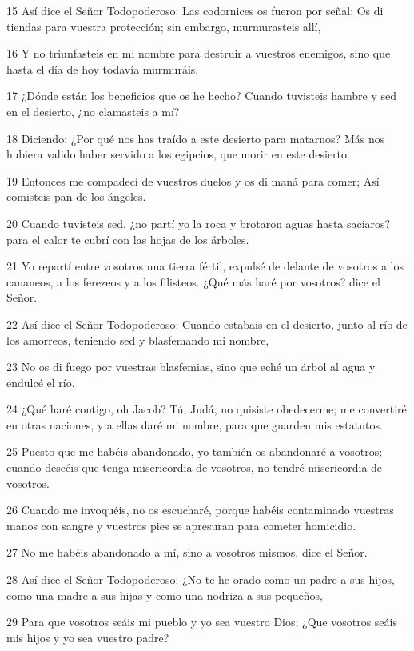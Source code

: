 \par 15 Así dice el Señor Todopoderoso: Las codornices os fueron por señal; Os di tiendas para vuestra protección; sin embargo, murmurasteis allí,
\par 16 Y no triunfasteis en mi nombre para destruir a vuestros enemigos, sino que hasta el día de hoy todavía murmuráis.
\par 17 ¿Dónde están los beneficios que os he hecho? Cuando tuvisteis hambre y sed en el desierto, ¿no clamasteis a mí?
\par 18 Diciendo: ¿Por qué nos has traído a este desierto para matarnos? Más nos hubiera valido haber servido a los egipcios, que morir en este desierto.
\par 19 Entonces me compadecí de vuestros duelos y os di maná para comer; Así comisteis pan de los ángeles.
\par 20 Cuando tuvisteis sed, ¿no partí yo la roca y brotaron aguas hasta saciaros? para el calor te cubrí con las hojas de los árboles.
\par 21 Yo repartí entre vosotros una tierra fértil, expulsé de delante de vosotros a los cananeos, a los ferezeos y a los filisteos. ¿Qué más haré por vosotros? dice el Señor.
\par 22 Así dice el Señor Todopoderoso: Cuando estabais en el desierto, junto al río de los amorreos, teniendo sed y blasfemando mi nombre,
\par 23 No os di fuego por vuestras blasfemias, sino que eché un árbol al agua y endulcé el río.
\par 24 ¿Qué haré contigo, oh Jacob? Tú, Judá, no quisiste obedecerme; me convertiré en otras naciones, y a ellas daré mi nombre, para que guarden mis estatutos.
\par 25 Puesto que me habéis abandonado, yo también os abandonaré a vosotros; cuando deseéis que tenga misericordia de vosotros, no tendré misericordia de vosotros.
\par 26 Cuando me invoquéis, no os escucharé, porque habéis contaminado vuestras manos con sangre y vuestros pies se apresuran para cometer homicidio.
\par 27 No me habéis abandonado a mí, sino a vosotros mismos, dice el Señor.
\par 28 Así dice el Señor Todopoderoso: ¿No te he orado como un padre a sus hijos, como una madre a sus hijas y como una nodriza a sus pequeños,
\par 29 Para que vosotros seáis mi pueblo y yo sea vuestro Dios; ¿Que vosotros seáis mis hijos y yo sea vuestro padre?
